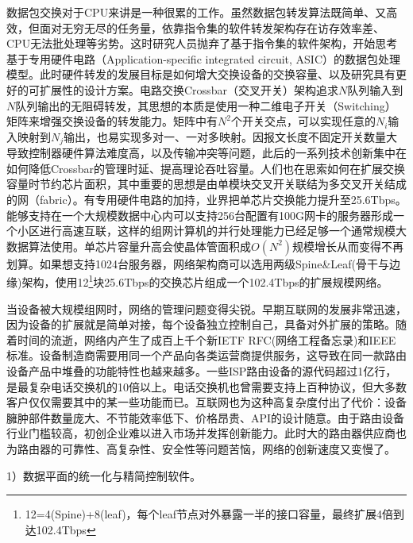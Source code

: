 数据包交换对于CPU来讲是一种很累的工作。虽然数据包转发算法既简单、又高效，但面对无穷无尽的任务量，依靠指令集的软件转发架构存在访存效率差、CPU无法批处理等劣势。这时研究人员抛弃了基于指令集的软件架构，开始思考基于专用硬件电路（Application-specific integrated circuit, ASIC）的数据包处理模型。此时硬件转发的发展目标是如何增大交换设备的交换容量、以及研究具有更好的可扩展性的设计方案。电路交换Crossbar（交叉开关）架构追求$N$队列输入到$N$队列输出的无阻碍转发，其思想的本质是使用一种二维电子开关（Switching）矩阵来增强交换设备的转发能力。矩阵中有$N^2$个开关交点，可以实现任意的$N_i$输入映射到$N_j$输出，也易实现多对一、一对多映射。因报文长度不固定开关数量大导致控制器硬件算法难度高，以及传输冲突等问题，此后的一系列技术创新集中在如何降低Crossbar的管理时延、提高理论吞吐容量。人们也在思索如何在扩展交换容量时节约芯片面积，其中重要的思想是由单模块交叉开关联结为多交叉开关结成的网（fabric）。有专用硬件电路的加持，业界把单芯片交换能力提升至25.6Tbps。能够支持在一个大规模数据中心内可以支持256台配置有100G网卡的服务器形成一个小区进行高速互联，这样的组网计算机的并行处理能力已经足够一个通常规模大数据算法使用。单芯片容量升高会使晶体管面积成$O(N^2)$规模增长从而变得不再划算。如果想支持1024台服务器，网络架构商可以选用两级Spine\&Leaf(骨干与边缘)架构，使用12\footnote{12=4(Spine)+8(leaf)，每个leaf节点对外暴露一半的接口容量，最终扩展4倍到达102.4Tbps}块25.6Tbps的交换芯片组成一个102.4Tbps的扩展规模网络。

当设备被大规模组网时，网络的管理问题变得尖锐。早期互联网的发展非常迅速，因为设备的扩展就是简单对接，每个设备独立控制自己，具备对外扩展的策略。随着时间的流逝，网络内产生了成百上千个新IETF RFC(网络工程备忘录)和IEEE标准。设备制造商需要用同一个产品向各类运营商提供服务，这导致在同一款路由设备产品中堆叠的功能特性也越来越多。一些ISP路由设备的源代码超过1亿行，是最复杂电话交换机的10倍以上。电话交换机也曾需要支持上百种协议，但大多数客户仅仅需要其中的某一些功能而已。互联网也为这种高复杂度付出了代价：设备臃肿部件数量庞大、不节能效率低下、价格昂贵、API的设计随意。由于路由设备行业门槛较高，初创企业难以进入市场并发挥创新能力。此时大的路由器供应商也为路由器的可靠性、高复杂性、安全性等问题苦恼，网络的创新速度又变慢了。


\label{chap223} 

1）数据平面的统一化与精简控制软件。

